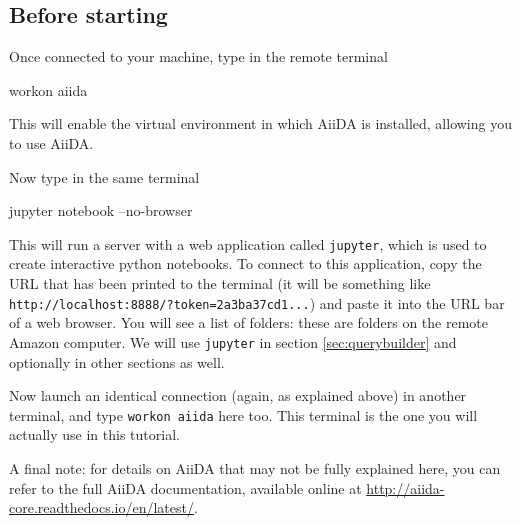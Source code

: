 \subsection*{Before starting}

Once connected to your machine, type in the remote terminal
\begin{bashcommand}
 workon aiida
\end{bashcommand}
This will enable the virtual environment in which AiiDA is installed, allowing you to use AiiDA. %

Now type in the same terminal
\begin{bashcommand}
 jupyter notebook --no-browser
\end{bashcommand}
This will run a server with a web application called \texttt{jupyter}, which is used to create interactive python notebooks. To connect to this application, copy the URL that has been printed to the terminal (it will be something like \texttt{http://localhost:8888/?token=2a3ba37cd1...}) and paste it into the URL bar of a web browser. You will see a list of folders: these are folders on the remote Amazon computer.
We will use \texttt{jupyter} in section \ref{sec:querybuilder} and optionally in other sections as well.

Now launch an identical  connection (again, as explained above) in another terminal, and type \texttt{workon aiida} here too. This terminal is the one you will actually use in this tutorial.


A final note: for details on AiiDA that may not be fully explained here, you can refer to the full AiiDA documentation, available online at \url{http://aiida-core.readthedocs.io/en/latest/}.

